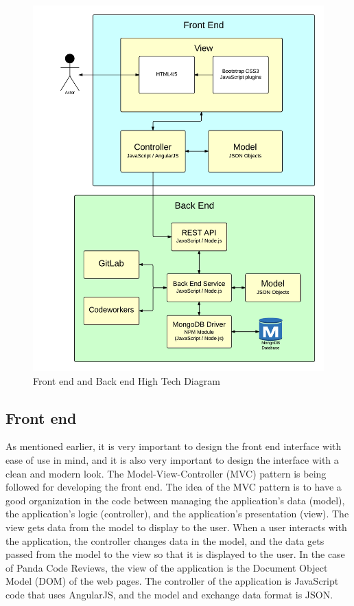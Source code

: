 \begin{figure}[H]
    \centering
    \includegraphics[width=\textwidth]{img/archi}
    \caption{Front end and Back end High Tech Diagram\label{fig:archi}}
\end{figure}

\subsection{Front end}

As mentioned earlier, it is very important to design the front end interface
with ease of use in mind, and it is also very important to design the interface
with a clean and modern look. The Model-View-Controller (MVC) pattern is being
followed for developing the front end. The idea of the MVC pattern is to have a
good organization in the code between managing the application's data (model),
the application's logic (controller), and the application's presentation (view).
The view gets data from the model to display to the user. When a user interacts
with the application, the controller changes data in the model, and the data
gets passed from the model to the view so that it is displayed to the user. In
the case of Panda Code Reviews, the view of the application is the Document
Object Model (DOM) of the web pages. The controller of the application is
JavaScript code that uses AngularJS\cite{angular}, and the model and exchange
data format is JSON.

